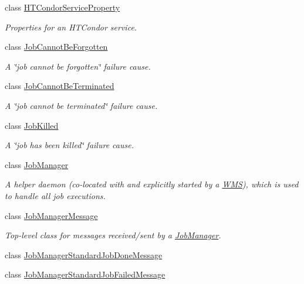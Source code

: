 \begin{DoxyCompactItemize}
class \hyperlink{classwrench_1_1_h_t_condor_service_property}{H\+T\+Condor\+Service\+Property}
\begin{DoxyCompactList}\small\item\em Properties for an H\+T\+Condor service. \end{DoxyCompactList}\item 
class \hyperlink{classwrench_1_1_job_cannot_be_forgotten}{Job\+Cannot\+Be\+Forgotten}
\begin{DoxyCompactList}\small\item\em A \char`\"{}job cannot be forgotten\char`\"{} failure cause. \end{DoxyCompactList}\item 
class \hyperlink{classwrench_1_1_job_cannot_be_terminated}{Job\+Cannot\+Be\+Terminated}
\begin{DoxyCompactList}\small\item\em A \char`\"{}job cannot be terminated\char`\"{} failure cause. \end{DoxyCompactList}\item 
class \hyperlink{classwrench_1_1_job_killed}{Job\+Killed}
\begin{DoxyCompactList}\small\item\em A \char`\"{}job has been killed\char`\"{} failure cause. \end{DoxyCompactList}\item 
class \hyperlink{classwrench_1_1_job_manager}{Job\+Manager}
\begin{DoxyCompactList}\small\item\em A helper daemon (co-\/located with and explicitly started by a \hyperlink{classwrench_1_1_w_m_s}{W\+MS}), which is used to handle all job executions. \end{DoxyCompactList}\item 
class \hyperlink{classwrench_1_1_job_manager_message}{Job\+Manager\+Message}
\begin{DoxyCompactList}\small\item\em Top-\/level class for messages received/sent by a \hyperlink{classwrench_1_1_job_manager}{Job\+Manager}. \end{DoxyCompactList}\item 
class \hyperlink{classwrench_1_1_job_manager_standard_job_done_message}{Job\+Manager\+Standard\+Job\+Done\+Message}
\item 
class \hyperlink{classwrench_1_1_job_manager_standard_job_failed_message}{Job\+Manager\+Standard\+Job\+Failed\+Message}
\item 

\end{DoxyCompactItemize}
